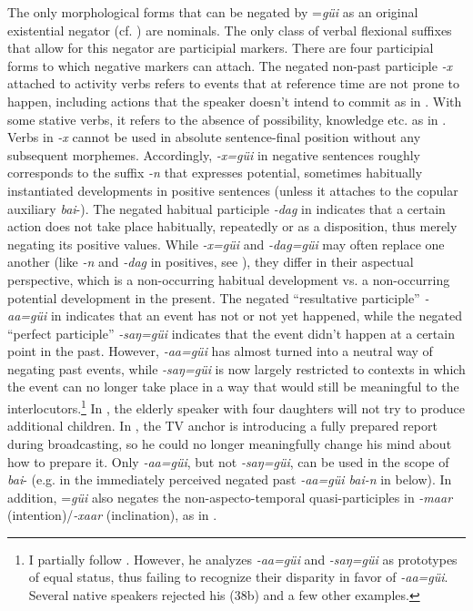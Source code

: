 \documentclass[output=paper,colorlinks,citecolor=brown,chinesefont]{langscibook}
\begin{document}
The only morphological forms that can be negated by =\textit{güi} as an original existential negator (cf. \citealt{Veselinova2014}) are nominals. The only class of verbal flexional suffixes that allow for this negator are participial markers. There are four participial forms to which negative markers can attach. The negated non-past participle \textit{-x} attached to activity verbs refers to events that at reference time are not prone to happen, including actions that the speaker doesn’t intend to commit as in . With some stative verbs, it refers to the absence of possibility, knowledge etc. as in . Verbs in \textit{-x} cannot be used in absolute sentence-final position without any subsequent morphemes. Accordingly, \textit{-x=güi} in negative sentences roughly corresponds to the suffix \textit{-n} that expresses potential, sometimes habitually instantiated developments in positive sentences (unless it attaches to the copular auxiliary \textit{bai}{}-).
The negated habitual participle \textit{-dag} in  indicates that a certain action does not take place habitually, repeatedly or as a disposition, thus merely negating its positive values. While \textit{-x=güi} and \textit{-dag=güi} may often replace one another (like \textit{-n} and \textit{-dag} in positives, see \citealt{Brosig2015Aspect}), they differ in their aspectual perspective, which is a non-occurring habitual development vs. a non-occurring potential development in the present. The negated “resultative participle” \textit{-aa=güi} in  indicates that an event has not or not yet happened, while the negated “perfect participle” \textit{-saŋ=güi} indicates that the event didn’t happen at a certain point in the past. However, \textit{-aa=güi} has almost turned into a neutral way of negating past events, while \textit{-saŋ=güi} is now largely restricted to contexts in which the event can no longer take place in a way that would still be meaningful to the interlocutors.\footnote{I partially follow \citet{Hashimoto2007}. However, he analyzes \textit{-aa=güi} and \textit{-saŋ=güi} as prototypes of equal status, thus failing to recognize their disparity in favor of \textit{-aa=güi}. Several native speakers      rejected his (38b) and a few other examples.} %
In , the elderly speaker with four daughters will not try to produce additional children. In , the TV anchor is introducing a fully prepared report during broadcasting, so he could no longer meaningfully change his mind about how to prepare it. Only \textit{-aa=güi}, but not \textit{-saŋ=güi}, can be used in the scope of \textit{bai}{}- (e.g. in the immediately perceived negated past \textit{-aa=güi bai-n} in  below). In addition, =\textit{güi} also negates the non-aspecto-temporal quasi-participles in \textit{-maar} (intention)/\textit{-xaar} (inclination), as in . 
\end{document}
